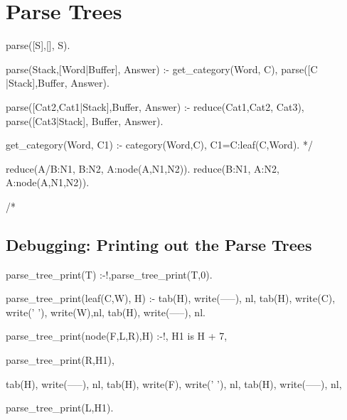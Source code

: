 \documentclass{book}[9pt]
\newenvironment{code}%
{\small \verbatim}%
{\endverbatim \large}
\begin{document}
\section{Parse Trees}

\begin{code}
parse([S],[], S).

parse(Stack,[Word|Buffer],  Answer) :-
        get_category(Word, C),
        parse([C |Stack],Buffer, Answer).

parse([Cat2,Cat1|Stack],Buffer, Answer) :-
        reduce(Cat1,Cat2, Cat3),
        parse([Cat3|Stack], Buffer, Answer).

get_category(Word, C1) :-
        category(Word,C),
        C1=C:leaf(C,Word).
*/

reduce(A/B:N1,    B:N2,    A:node(A,N1,N2)).
reduce(B:N1,    A\B:N2,    A:node(A,N1,N2)).

/*
\end{code}

\subsection{Debugging: Printing out the Parse Trees}

\begin{code}
parse_tree_print(T) :-!,parse_tree_print(T,0).

parse_tree_print(leaf(C,W), H) :-
        tab(H), write(-----),    nl,
        tab(H), write(C), write(' '), write(W),nl,
        tab(H), write(-----),    nl.
        
parse_tree_print(node(F,L,R),H) :-!,
        H1 is H + 7,
        
        parse_tree_print(R,H1),
        
        tab(H), write(-----),    nl,
        tab(H), write(F), write(' '), nl,
        tab(H), write(-----),    nl,
        
        parse_tree_print(L,H1).
\end{code}
\end{document}
